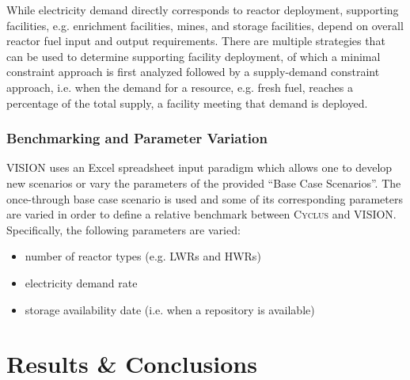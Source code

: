 \documentclass{anstrans}
\begin{document}
While electricity demand directly corresponds to reactor deployment,
supporting facilities, e.g. enrichment facilities, mines, and storage
facilities, depend on overall reactor fuel input and output
requirements. There are multiple strategies that can be used to
determine supporting facility deployment, of which a minimal
constraint approach is first analyzed followed by a supply-demand
constraint approach, i.e. when the demand for a resource, e.g. fresh
fuel, reaches a percentage of the total supply, a facility meeting
that demand is deployed.

\subsubsection{Benchmarking and Parameter Variation}
VISION uses an Excel spreadsheet input paradigm which allows one to
develop new scenarios or vary the parameters of the provided ``Base
Case Scenarios''. The once-through base case scenario is used and some
of its corresponding parameters are varied in order to define a
relative benchmark between \textsc{Cyclus} and VISION. Specifically, the
following parameters are varied:
\begin{itemize}
\item number of reactor types (e.g. LWRs and HWRs)
\item electricity demand rate
\item storage availability date (i.e. when a repository is available)
\end{itemize}

\section{Results \& Conclusions}

\end{document}
